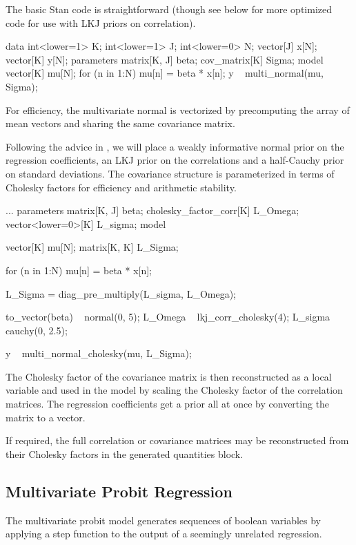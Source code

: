 The basic Stan code is straightforward (though see below for more
optimized code for use with LKJ priors on correlation).
%
\begin{stancode}
data {
  int<lower=1> K;
  int<lower=1> J;
  int<lower=0> N;
  vector[J] x[N];
  vector[K] y[N];
}
parameters {
  matrix[K, J] beta;
  cov_matrix[K] Sigma;
}
model {
  vector[K] mu[N];
  for (n in 1:N)
    mu[n] = beta * x[n];
  y ~ multi_normal(mu, Sigma);
}
\end{stancode}
%
For efficiency, the multivariate normal is vectorized by precomputing
the array of mean vectors and sharing the same covariance matrix.

Following the advice in ,
we will place a weakly informative normal prior on the regression
coefficients, an LKJ prior on the correlations and a half-Cauchy prior
on standard deviations.  The covariance structure is parameterized in
terms of Cholesky factors for efficiency and arithmetic stability.
%
\begin{stancode}
...
parameters {
  matrix[K, J] beta;
  cholesky_factor_corr[K] L_Omega;
  vector<lower=0>[K] L_sigma;
}
model {
  vector[K] mu[N];
  matrix[K, K] L_Sigma;

  for (n in 1:N)
    mu[n] = beta * x[n];

  L_Sigma = diag_pre_multiply(L_sigma, L_Omega);

  to_vector(beta) ~ normal(0, 5);
  L_Omega ~ lkj_corr_cholesky(4);
  L_sigma ~ cauchy(0, 2.5);

  y ~ multi_normal_cholesky(mu, L_Sigma);
}
\end{stancode}
%
The Cholesky factor of the covariance matrix is then reconstructed as
a local variable and used in the model by scaling the Cholesky factor
of the correlation matrices. The regression coefficients get a prior
all at once by converting the matrix  to a vector.

If required, the full correlation or covariance matrices may be
reconstructed from their Cholesky factors in the generated quantities
block.


\subsection{Multivariate Probit Regression}

The multivariate probit model generates sequences of boolean variables
by applying a step function to the output of a seemingly unrelated
regression.

